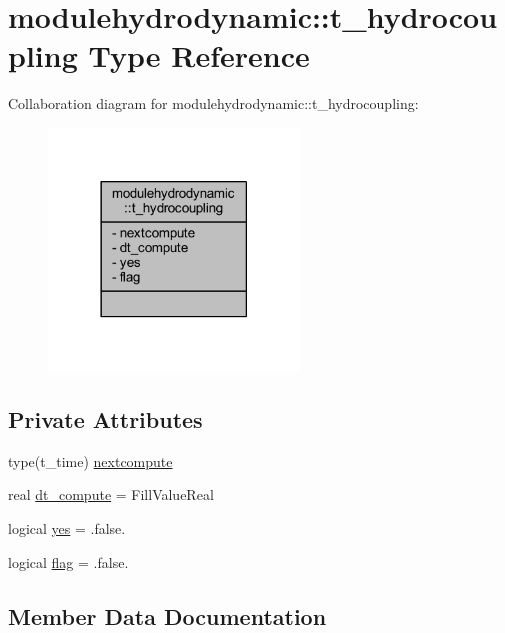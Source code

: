 \hypertarget{structmodulehydrodynamic_1_1t__hydrocoupling}{}\section{modulehydrodynamic\+:\+:t\+\_\+hydrocoupling Type Reference}
\label{structmodulehydrodynamic_1_1t__hydrocoupling}


Collaboration diagram for modulehydrodynamic\+:\+:t\+\_\+hydrocoupling\+:\nopagebreak
\begin{figure}[H]
\begin{center}
\leavevmode
\includegraphics[width=189pt]{structmodulehydrodynamic_1_1t__hydrocoupling__coll__graph}
\end{center}
\end{figure}
\subsection*{Private Attributes}
\begin{DoxyCompactItemize}
\item 
type(t\+\_\+time) \mbox{\hyperlink{structmodulehydrodynamic_1_1t__hydrocoupling_a388aba413256888cc10111cec67f1ded}{nextcompute}}
\item 
real \mbox{\hyperlink{structmodulehydrodynamic_1_1t__hydrocoupling_a9933eef72c97f3307e40ab837d41fadd}{dt\+\_\+compute}} = Fill\+Value\+Real
\item 
logical \mbox{\hyperlink{structmodulehydrodynamic_1_1t__hydrocoupling_af9c986cc20f4c75ae57017999b92665c}{yes}} = .false.
\item 
logical \mbox{\hyperlink{structmodulehydrodynamic_1_1t__hydrocoupling_afd795449683c6cc31bb32a944c00a228}{flag}} = .false.
\end{DoxyCompactItemize}


\subsection{Member Data Documentation}
\mbox{\label{structmodulehydrodynamic_1_1t__hydrocoupling_a9933eef72c97f3307e40ab837d41fadd}} 
